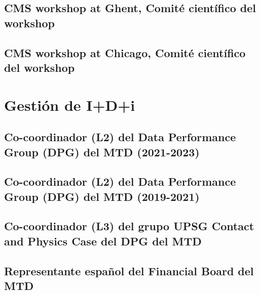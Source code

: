 \documentclass[a4paper, 11pt, twoside, openright]{report}
\begin{document}
\subsection{CMS workshop at Ghent, Comité científico del workshop}


\subsection{CMS workshop at Chicago, Comité científico del workshop}



\section{Gestión de I+D+i}

\subsection{Co-coordinador (L2) del Data Performance Group (DPG) del MTD (2021-2023)}


\subsection{Co-coordinador (L2) del Data Performance Group (DPG) del MTD (2019-2021)}


\subsection{Co-coordinador (L3) del grupo UPSG Contact and Physics Case del DPG del MTD}


\subsection{Representante español del Financial Board del MTD}

\end{document}
